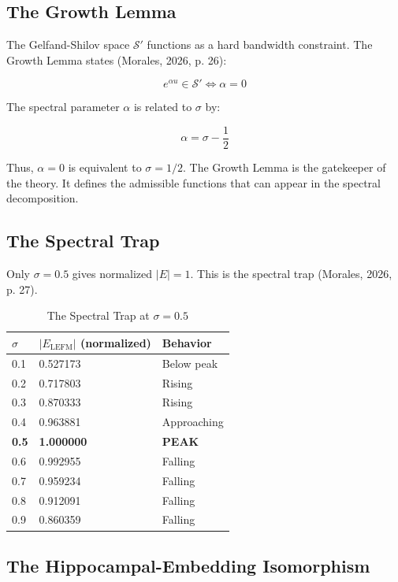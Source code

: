 \documentclass{article}
\begin{document}
\subsection{The Growth Lemma}

The Gelfand-Shilov space $\mathcal{S}'$ functions as a hard bandwidth constraint. The Growth Lemma states (Morales, 2026, p. 26):

\begin{equation}
e^{\alpha u} \in \mathcal{S}' \iff \alpha = 0
\end{equation}

The spectral parameter $\alpha$ is related to $\sigma$ by:

\begin{equation}
\alpha = \sigma - \frac{1}{2}
\end{equation}

Thus, $\alpha = 0$ is equivalent to $\sigma = 1/2$. The Growth Lemma is the gatekeeper of the theory. It defines the admissible functions that can appear in the spectral decomposition.

\subsection{The Spectral Trap}

Only $\sigma = 0.5$ gives normalized $|E| = 1$. This is the spectral trap (Morales, 2026, p. 27).

\begin{table}[ht]
\centering
\caption{The Spectral Trap at $\sigma = 0.5$}
\begin{tabular}{lll}
\toprule
$\sigma$ & $|E_{\text{LEFM}}|$ (normalized) & Behavior \\
\midrule
0.1 & 0.527173 & Below peak \\
0.2 & 0.717803 & Rising \\
0.3 & 0.870333 & Rising \\
0.4 & 0.963881 & Approaching \\
\textbf{0.5} & \textbf{1.000000} & \textbf{PEAK} \\
0.6 & 0.992955 & Falling \\
0.7 & 0.959234 & Falling \\
0.8 & 0.912091 & Falling \\
0.9 & 0.860359 & Falling \\
\bottomrule
\end{tabular}
\end{table}

\subsection{The Hippocampal-Embedding Isomorphism}
\end{document}
